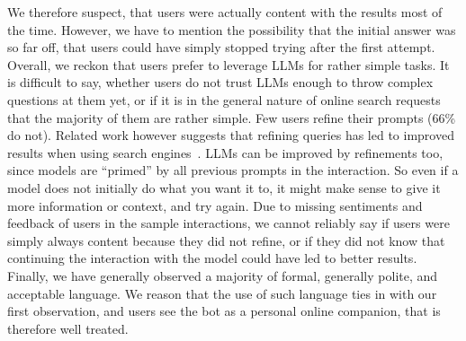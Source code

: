 We therefore suspect, that users were actually content with the results most of the time.
However, we have to mention the possibility that the initial answer was so far off,
that users could have simply stopped trying after the first attempt.
Overall, we reckon that users prefer to leverage LLMs for rather simple tasks.
It is difficult to say, whether users do not trust LLMs enough to throw complex questions at
them yet, or if it is in the general nature of online search requests that the majority of
them are rather simple.
Few users refine their prompts (66\% do not).
Related work however suggests that refining queries has led to improved results when using search
engines~\cite{huang_analyzing_2009}.
LLMs can be improved by refinements too, since models are “primed” by all previous prompts in
the interaction.
So even if a model does not initially do what you want it to, it might make
sense to give it more information or context, and try again.
Due to missing sentiments and feedback of users in the sample interactions, we cannot reliably say
if users were simply always content because they did not refine, or if they did not know that
continuing the interaction with the model could have led to better results.
Finally, we have generally observed a majority of formal, generally polite, and acceptable language.
We reason that the use of such language ties in with our first observation, and users see
the bot as a personal online companion, that is therefore well treated.

